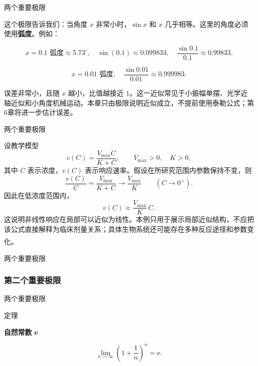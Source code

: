 \documentclass[aspectratio=169,10pt,fontset=fandol]{ctexbeamer}
\newcommand{\ee}{\mathrm{e}}
\newcommand{\upcite}[1]{\textsuperscript{\textsuperscript{\cite{#1}}}}
\begin{document}
\begin{frame}[t,fragile]{两个重要极限}
\footnotesize
{\footnotesize
\begin{application}[物理：小角度近似]

这个极限告诉我们：当角度 \(x\) 非常小时，\(\sin x\) 和 \(x\) 几乎相等。这里的角度必须使用\textbf{弧度}。例如：

\[
x = 0.1 \text{ 弧度} \approx 5.73^\circ,\quad \sin(0.1) \approx 0.099833,\quad \dfrac{\sin 0.1}{0.1} \approx 0.99833.
\]

\[
x = 0.01 \text{ 弧度},\quad \dfrac{\sin 0.01}{0.01} \approx 0.999983.
\]

误差非常小，且随 \(x\) 越小，比值越接近 $1$。这一近似常见于小振幅单摆、光学近轴近似和小角度机械运动。本章只由极限说明近似成立，不提前使用泰勒公式；第6章将进一步估计误差。

\end{application}
}
\end{frame}
\begin{frame}[t,fragile]{两个重要极限}
\footnotesize
{\footnotesize
\begin{application}
设教学模型
\[
v(C)=\frac{V_{\max}C}{K+C},\qquad V_{\max}>0,\quad K>0,
\]
其中 $C$ 表示浓度，$v(C)$ 表示响应速率。假设在所研究范围内参数保持不变，则
\[
\frac{v(C)}{C}=\frac{V_{\max}}{K+C}
\longrightarrow\frac{V_{\max}}K
\qquad(C\to0^+).
\]
因此在低浓度范围内，
\[
v(C)\approx\frac{V_{\max}}K\,C.
\]
这说明非线性响应在局部可以近似为线性。本例只用于展示局部近似结构，不应把该公式直接解释为临床剂量关系；具体生物系统还可能存在多种反应途径和参数变化。\upcite{NCBIEnzyme}
\end{application}
}
\end{frame}
\begin{frame}[t,fragile]{两个重要极限}
\footnotesize
{\footnotesize
\subsubsection*{第二个重要极限}


}
\end{frame}
\begin{frame}[t,fragile]{两个重要极限}
\footnotesize
\begin{block}{定理}
{\footnotesize
\textbf{自然常数 e }\par

	\[
	\lim_{n\to\infty} \left(1 + \dfrac{1}{n}\right)^n = \ee.
	\]

}
\end{block}
\end{frame}
\end{document}
